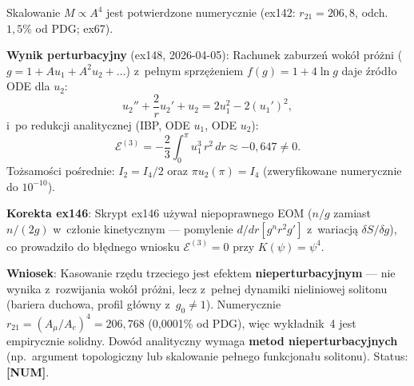 \begin{remark}%
\label{rem:R-E3-status}
Skalowanie $M \propto A^4$ jest potwierdzone numerycznie
(ex142: $r_{21} = 206{,}8$, odch.~$1{,}5\%$ od PDG; ex67).

\smallskip\noindent
\textbf{Wynik perturbacyjny} (ex148, 2026-04-05):
Rachunek zaburze\'n wok\'o\l{} pr\'o\.zni ($g = 1 + Au_1 + A^2 u_2 + \ldots$)
z~pe\l{}nym sprz\k{e}\.zeniem $f(g) = 1 + 4\ln g$ daje \'zr\'od\l{}o
ODE dla $u_2$:
\begin{equation}\label{eq:R-u2-source}
  u_2'' + \frac{2}{r}u_2' + u_2 = 2u_1^2 - 2(u_1')^2,
\end{equation}
i~po redukcji analitycznej (IBP, ODE $u_1$, ODE $u_2$):
\begin{equation}\label{eq:R-E3-reduced}
  \mathcal{E}^{(3)} = -\frac{2}{3}\!\int_0^\pi u_1^3\,r^2\,dr
  \approx -0{,}647 \neq 0.
\end{equation}
To\.zsamo\'sci po\'srednie:
$I_2 = I_4/2$ oraz $\pi u_2(\pi) = I_4$
(zweryfikowane numerycznie do $10^{-10}$).

\smallskip\noindent
\textbf{Korekta ex146}: Skrypt ex146 u\.zywa\l{}
niepoprawnego EOM ($n/g$ zamiast $n/(2g)$ w~cz\l{}onie
kinetycznym --- pomylenie $d/dr[g^n r^2 g']$ z~wariacj\k{a}
$\delta S/\delta g$), co prowadzi\l{}o do b\l{}\k{e}dnego wniosku
$\mathcal{E}^{(3)} = 0$ przy $K(\psi) = \psi^4$.

\smallskip\noindent
\textbf{Wniosek}: Kasowanie rz\k{e}du trzeciego jest efektem
\textbf{nieperturbacyjnym} --- nie wynika z~rozwijania wok\'o\l{}
pr\'o\.zni, lecz z~pe\l{}nej dynamiki nieliniowej solitonu
(bariera duchowa, profil g\l{}\'owny z~$g_0 \neq 1$).
Numerycznie $r_{21} = (A_\mu/A_e)^4 = 206{,}768$
(0{,}0001\% od PDG), wi\k{e}c wyk\l{}adnik~4 jest
empirycznie solidny.
Dow\'od analityczny wymaga \textbf{metod nieperturbacyjnych}
(np.\ argument topologiczny lub ska\-lo\-wa\-nie pe\l{}nego
funkcjona\l{}u solitonu). Status: \textbf{[NUM]}.
\end{remark}

